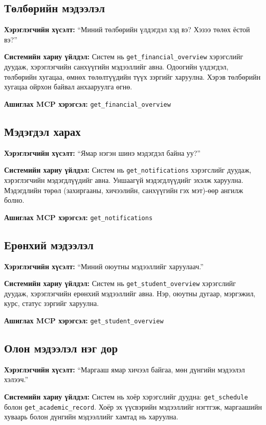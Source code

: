 \subsection{Төлбөрийн мэдээлэл}

\textbf{Хэрэглэгчийн хүсэлт:} ``Миний төлбөрийн үлдэгдэл хэд вэ? Хэзээ төлөх ёстой вэ?''

\textbf{Системийн хариу үйлдэл:} Систем нь \texttt{get\_financial\_overview} хэрэгслийг дуудаж, хэрэглэгчийн санхүүгийн мэдээллийг авна. Одоогийн үлдэгдэл, төлбөрийн хугацаа, өмнөх төлөлтүүдийн түүх зэргийг харуулна. Хэрэв төлбөрийн хугацаа ойрхон байвал анхааруулга өгнө.

\textbf{Ашиглах MCP хэрэгсэл:} \texttt{get\_financial\_overview}

\subsection{Мэдэгдэл харах}

\textbf{Хэрэглэгчийн хүсэлт:} ``Ямар нэгэн шинэ мэдэгдэл байна уу?''

\textbf{Системийн хариу үйлдэл:} Систем нь \texttt{get\_notifications} хэрэгслийг дуудаж, хэрэглэгчийн мэдэгдлүүдийг авна. Уншаагүй мэдэгдлүүдийг эхэлж харуулна. Мэдэгдлийн төрөл (захиргааны, хичээлийн, санхүүгийн гэх мэт)-өөр ангилж болно.

\textbf{Ашиглах MCP хэрэгсэл:} \texttt{get\_notifications}

\subsection{Ерөнхий мэдээлэл}

\textbf{Хэрэглэгчийн хүсэлт:} ``Миний оюутны мэдээллийг харуулаач.''

\textbf{Системийн хариу үйлдэл:} Систем нь \texttt{get\_student\_overview} хэрэгслийг дуудаж, хэрэглэгчийн ерөнхий мэдээллийг авна. Нэр, оюутны дугаар, мэргэжил, курс, статус зэргийг харуулна.

\textbf{Ашиглах MCP хэрэгсэл:} \texttt{get\_student\_overview}

\subsection{Олон мэдээлэл нэг дор}

\textbf{Хэрэглэгчийн хүсэлт:} ``Маргааш ямар хичээл байгаа, мөн дүнгийн мэдээлэл хэлээч.''

\textbf{Системийн хариу үйлдэл:} Систем нь хоёр хэрэгслийг дуудна: \texttt{get\_schedule} болон \texttt{get\_academic\_record}. Хоёр эх үүсвэрийн мэдээллийг нэгтгэж, маргаашийн хуваарь болон дүнгийн мэдээллийг хамтад нь харуулна.

